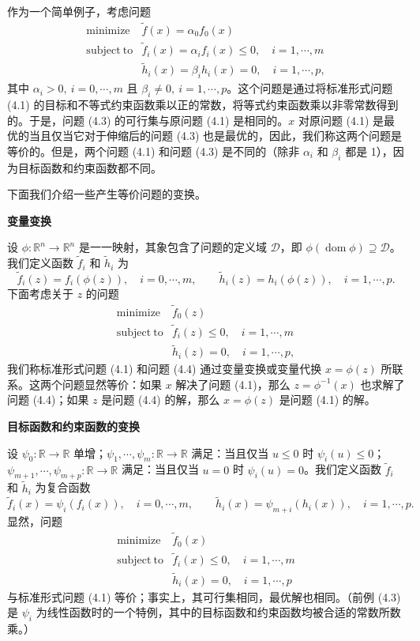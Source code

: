 \documentclass[UTF8, 12pt, fontset=fandol, oneside]{ctexart}
\begin{document}
作为一个简单例子，考虑问题
\begin{equation}
\begin{array}{ll}
\mathop{\mathrm{minimize}} & \tilde{f}(x)=\alpha_0f_0(x)\\
\mathrm{subject\ to} & \tilde{f}_i(x)=\alpha_i f_i(x)\leq 0,\quad i=1,\cdots,m\\
& \tilde{h}_i(x)=\beta_i h_i(x)=0,\quad i=1,\cdots,p,
\end{array}
\tag{4.3}
\end{equation}
其中 $\alpha_i>0,\ i=0,\cdots,m$ 且 $\beta_i\neq 0,\ i=1,\cdots,p$。这个问题是通过将标准形式问题 (4.1) 的目标和不等式约束函数乘以正的常数，将等式约束函数乘以非零常数得到的。于是，问题 (4.3) 的可行集与原问题 (4.1) 是相同的。$x$ 对原问题 (4.1) 是最优的当且仅当它对于伸缩后的问题 (4.3) 也是最优的，因此，我们称这两个问题是等价的。但是，两个问题 (4.1) 和问题 (4.3) 是不同的（除非 $\alpha_i$ 和 $\beta_i$ 都是 1），因为目标函数和约束函数都不同。

下面我们介绍一些产生等价问题的变换。

\noindent\textbf{变量变换}

设 $\phi:\mathbb{R}^n\to\mathbb{R}^n$ 是一一映射，其象包含了问题的定义域 $\mathcal{D}$，即 $\phi(\operatorname{dom}\phi)\supseteq\mathcal{D}$。我们定义函数 $\tilde{f}_i$ 和 $\tilde{h}_i$ 为
\[
\tilde{f}_i(z)=f_i(\phi(z)),\quad i=0,\cdots,m,\qquad
\tilde{h}_i(z)=h_i(\phi(z)),\quad i=1,\cdots,p.
\]
下面考虑关于 $z$ 的问题
\begin{equation}
\begin{array}{ll}
\mathop{\mathrm{minimize}} & \tilde{f}_0(z)\\
\mathrm{subject\ to} & \tilde{f}_i(z)\leq 0,\quad i=1,\cdots,m\\
& \tilde{h}_i(z)=0,\quad i=1,\cdots,p,
\end{array}
\tag{4.4}
\end{equation}
我们称标准形式问题 (4.1) 和问题 (4.4) 通过变量变换或变量代换 $x=\phi(z)$ 所联系。这两个问题显然等价：如果 $x$ 解决了问题 (4.1)，那么 $z=\phi^{-1}(x)$ 也求解了问题 (4.4)；如果 $z$ 是问题 (4.4) 的解，那么 $x=\phi(z)$ 是问题 (4.1) 的解。

\noindent\textbf{目标函数和约束函数的变换}

设 $\psi_0:\mathbb{R}\to\mathbb{R}$ 单增；$\psi_1,\cdots,\psi_m:\mathbb{R}\to\mathbb{R}$ 满足：当且仅当 $u\leq 0$ 时 $\psi_i(u)\leq 0$；$\psi_{m+1},\cdots,\psi_{m+p}:\mathbb{R}\to\mathbb{R}$ 满足：当且仅当 $u=0$ 时 $\psi_i(u)=0$。我们定义函数 $\tilde{f}_i$ 和 $\tilde{h}_i$ 为复合函数
\[
\tilde{f}_i(x)=\psi_i(f_i(x)),\quad i=0,\cdots,m,\qquad
\tilde{h}_i(x)=\psi_{m+i}(h_i(x)),\quad i=1,\cdots,p.
\]
显然，问题
\[
\begin{array}{ll}
\mathop{\mathrm{minimize}} & \tilde{f}_0(x)\\
\mathrm{subject\ to} & \tilde{f}_i(x)\leq 0,\quad i=1,\cdots,m\\
& \tilde{h}_i(x)=0,\quad i=1,\cdots,p
\end{array}
\]
与标准形式问题 (4.1) 等价；事实上，其可行集相同，最优解也相同。（前例 (4.3) 是 $\psi_i$ 为线性函数时的一个特例，其中的目标函数和约束函数均被合适的常数所数乘。）
\end{document}
